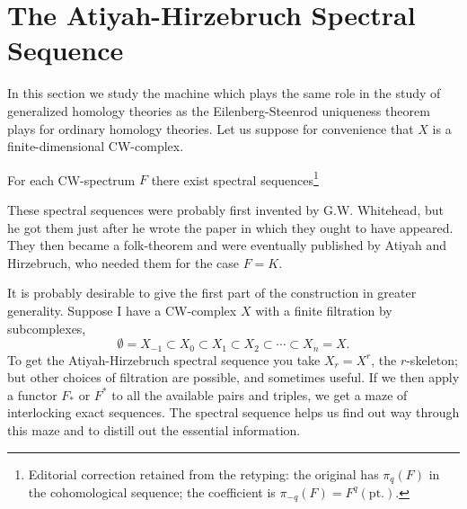\documentclass[../main]{subfiles}
\begin{document}


\chapter{The Atiyah-Hirzebruch Spectral Sequence}
\label{sec:p3c07}
In this section we study the machine which plays the same role in the study of generalized homology theories as the Eilenberg-Steenrod uniqueness theorem plays for ordinary homology theories. Let us suppose for convenience that $X$ is a finite-dimensional CW-complex.


\begin{theorem*}
For each CW-spectrum $F$ there exist spectral sequences\footnote{Editorial correction retained from the retyping: the original has $\pi_q(F)$ in the cohomological sequence; the coefficient is $\pi_{-q}(F)=F^q(\mathrm{pt.})$.}
\begin{center}
\end{center}
\end{theorem*}

These spectral sequences were probably first invented by G.W. Whitehead, but he got them just after he wrote the paper \cite{whitehead2} in which they ought to have appeared. They then became a folk-theorem and were eventually published by Atiyah and Hirzebruch, who needed them for the case $F=K$.

It is probably desirable to give the first part of the construction in greater generality. Suppose I have a CW-complex $X$ with a finite filtration by subcomplexes,
\begin{equation*}
    \emptyset=X_{-1}\subset X_0\subset X_1\subset X_2\subset\cdots\subset X_n=X.
\end{equation*}
To get the Atiyah-Hirzebruch spectral sequence you take $X_r=X^r$, the $r$-skeleton; but other choices of filtration are possible, and sometimes useful. If we then apply a functor $F_{\ast}$ or $F^{\ast}$ to all the available pairs and triples, we get a maze of interlocking exact sequences. The spectral sequence helps us find out way through this maze and to distill out the essential information.
\end{document}
